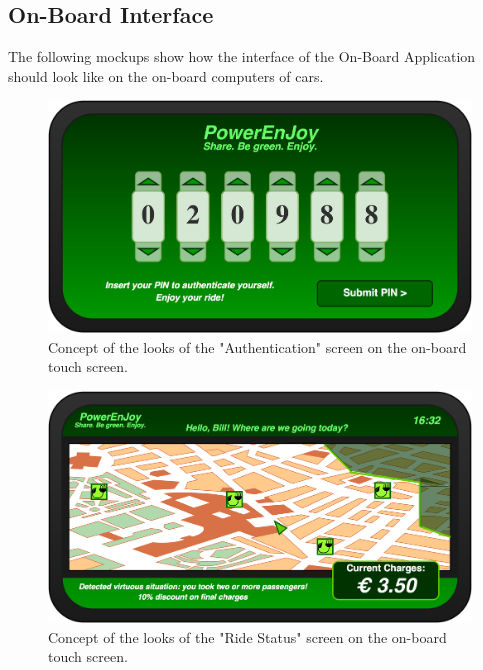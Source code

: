 \subsection{On-Board Interface}
The following mockups show how the interface of the On-Board Application should look like on the on-board computers of cars.

\begin{figure}[h]
\centering
		\includegraphics[width=\textwidth]{./user_interface_design/diagrams/onboard_auth.png}
		\caption{Concept of the looks of the "Authentication" screen on the on-board touch screen.}
		\label{onboard_auth}
\end{figure}

\begin{figure}[h]
\centering
		\includegraphics[width=\textwidth]{./user_interface_design/diagrams/onboard_ride.png}
		\caption{Concept of the looks of the "Ride Status" screen on the on-board touch screen.}
		\label{onboard_ride}
\end{figure}